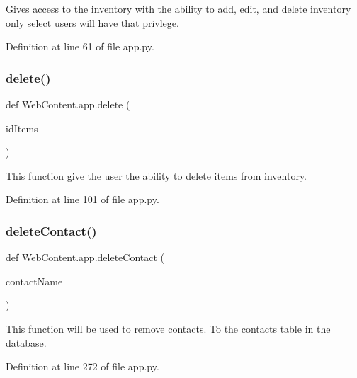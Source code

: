 \begin{DoxyVerb}Gives access to the inventory
with the ability to add, edit, and delete
inventory only select users will have that privlege.
\end{DoxyVerb}
 

Definition at line 61 of file app.\+py.

\mbox{\label{namespace_web_content_1_1app_a280b9c530dfd4125df19a186218bb132}} 
\subsubsection{\texorpdfstring{delete()}{delete()}}
{\footnotesize\ttfamily def Web\+Content.\+app.\+delete (\begin{DoxyParamCaption}\item[{}]{id\+Items }\end{DoxyParamCaption})}

\begin{DoxyVerb}This function give the user the
ability to delete items from inventory.
\end{DoxyVerb}
 

Definition at line 101 of file app.\+py.

\mbox{\label{namespace_web_content_1_1app_a8934b836311d8645b794937a4665b687}} 
\subsubsection{\texorpdfstring{delete\+Contact()}{deleteContact()}}
{\footnotesize\ttfamily def Web\+Content.\+app.\+delete\+Contact (\begin{DoxyParamCaption}\item[{}]{contact\+Name }\end{DoxyParamCaption})}

\begin{DoxyVerb}This function will be used to remove contacts.
To the contacts table in the database. 
\end{DoxyVerb}
 

Definition at line 272 of file app.\+py.

